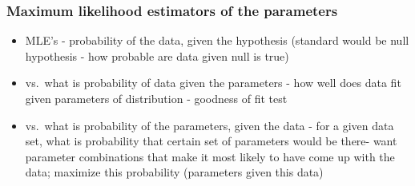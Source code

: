 \documentclass[]{article}
\newenvironment{Shaded}{\begin{snugshade}}{\end{snugshade}}
\newcommand{\KeywordTok}[1]{\textcolor[rgb]{0.13,0.29,0.53}{\textbf{#1}}}
\newcommand{\FloatTok}[1]{\textcolor[rgb]{0.00,0.00,0.81}{#1}}
\newcommand{\CommentTok}[1]{\textcolor[rgb]{0.56,0.35,0.01}{\textit{#1}}}
\newcommand{\OperatorTok}[1]{\textcolor[rgb]{0.81,0.36,0.00}{\textbf{#1}}}
\newcommand{\NormalTok}[1]{#1}
\providecommand{\tightlist}{%
  \setlength{\itemsep}{0pt}\setlength{\parskip}{0pt}}
\begin{document}
\begin{Shaded}
\end{Shaded}

\subsubsection{\texorpdfstring{\textbf{Maximum likelihood estimators of
the
parameters}}{Maximum likelihood estimators of the parameters}}\label{maximum-likelihood-estimators-of-the-parameters}

\begin{itemize}
\tightlist
\item
  MLE's - probability of the data, given the hypothesis (standard would
  be null hypothesis - how probable are data given null is true)
\item
  vs.~what is probability of data given the parameters - how well does
  data fit given parameters of distribution - goodness of fit test
\item
  vs.~what is probability of the parameters, given the data - for a
  given data set, what is probability that certain set of parameters
  would be there- want parameter combinations that make it most likely
  to have come up with the data; maximize this probability (parameters
  given this data)
\end{itemize}
\end{document}
